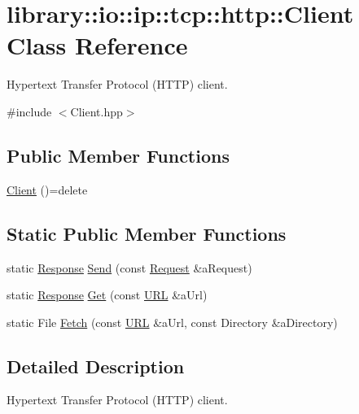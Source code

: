 \hypertarget{classlibrary_1_1io_1_1ip_1_1tcp_1_1http_1_1_client}{}\section{library\+:\+:io\+:\+:ip\+:\+:tcp\+:\+:http\+:\+:Client Class Reference}
\label{classlibrary_1_1io_1_1ip_1_1tcp_1_1http_1_1_client}


Hypertext Transfer Protocol (H\+T\+TP) client.  




{\ttfamily \#include $<$Client.\+hpp$>$}

\subsection*{Public Member Functions}
\begin{DoxyCompactItemize}
\item 
\hyperlink{classlibrary_1_1io_1_1ip_1_1tcp_1_1http_1_1_client_a15e8c6cbcc0ed6d37084f35371aa8ae0}{Client} ()=delete
\end{DoxyCompactItemize}
\subsection*{Static Public Member Functions}
\begin{DoxyCompactItemize}
\item 
static \hyperlink{classlibrary_1_1io_1_1ip_1_1tcp_1_1http_1_1_response}{Response} \hyperlink{classlibrary_1_1io_1_1ip_1_1tcp_1_1http_1_1_client_adb337267064f9d3f2530af896f7e8df8}{Send} (const \hyperlink{classlibrary_1_1io_1_1ip_1_1tcp_1_1http_1_1_request}{Request} \&a\+Request)
\item 
static \hyperlink{classlibrary_1_1io_1_1ip_1_1tcp_1_1http_1_1_response}{Response} \hyperlink{classlibrary_1_1io_1_1ip_1_1tcp_1_1http_1_1_client_a1c3b8e761e1cca7c7f9737d06a42fed0}{Get} (const \hyperlink{classlibrary_1_1io_1_1_u_r_l}{U\+RL} \&a\+Url)
\item 
static File \hyperlink{classlibrary_1_1io_1_1ip_1_1tcp_1_1http_1_1_client_a1e9b292adc7e6b2341889c4a7279204c}{Fetch} (const \hyperlink{classlibrary_1_1io_1_1_u_r_l}{U\+RL} \&a\+Url, const Directory \&a\+Directory)
\end{DoxyCompactItemize}


\subsection{Detailed Description}
Hypertext Transfer Protocol (H\+T\+TP) client. 


